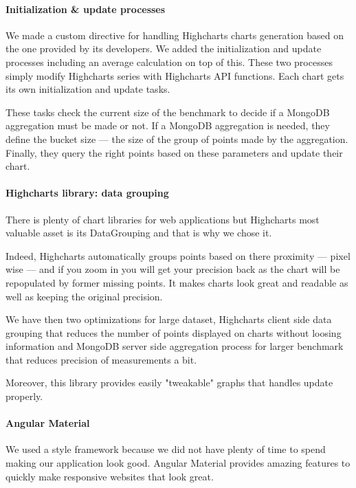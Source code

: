 \documentclass[a4paper,11pt]{report}
\begin{document}
\paragraph{Initialization \& update processes}

We made a custom directive for handling Highcharts charts generation based on the one provided by its developers. We added the initialization and update processes including an average calculation on top of this. These two processes simply modify Highcharts series with Highcharts API functions. Each chart gets its own initialization and update tasks.

These tasks check the current size of the benchmark to decide if a MongoDB aggregation must be made or not. If a MongoDB aggregation is needed, they define the bucket size --- the size of the group of points made by the aggregation. Finally, they query the right points based on these parameters and update their chart.

\paragraph{Highcharts library: data grouping}\label{data_grouping} There is plenty of chart libraries for web applications but Highcharts most valuable asset is its DataGrouping and that is why we chose it.

Indeed, Highcharts automatically groups points based on there proximity --- pixel wise --- and if you zoom in you will get your precision back as the chart will be repopulated by former missing points. It makes charts look great and readable as well as keeping the original precision.

We have then two optimizations for large dataset, Highcharts client side data grouping that reduces the number of points displayed on charts without loosing information and MongoDB server side aggregation process for larger benchmark that reduces precision of measurements a bit.

Moreover, this library provides easily "tweakable" graphs that handles update properly.

\paragraph{Angular Material} We used a style framework because we did not have plenty of time to spend making our application look good. Angular Material provides amazing features to quickly make responsive websites that look great.
\end{document}

